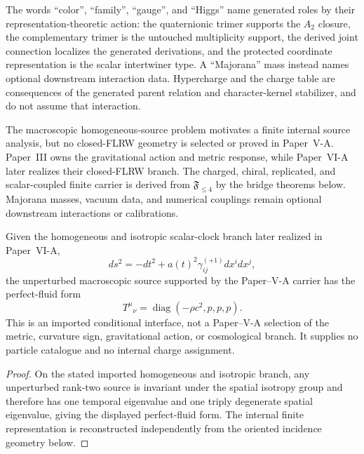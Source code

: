 \documentclass[12pt,a4paper]{article}
\begin{document}
\begin{remark}
\label{p5:rem:visible-sector-target-convention}
The words ``color'', ``family'', ``gauge'', and ``Higgs'' name generated
roles by their representation-theoretic action: the quaternionic trimer
supports the \(A_2\) closure, the complementary trimer is the untouched
multiplicity support, the derived joint connection localizes the generated
derivations, and the protected coordinate representation is the scalar
intertwiner type.  A ``Majorana'' mass instead names optional downstream
interaction data.  Hypercharge and the charge table are consequences of the
generated parent relation and character-kernel stabilizer, and do not
assume that interaction.
\end{remark}

\begin{remark}
\label{p5:rem:visible-source-support-residue}
The macroscopic homogeneous-source problem motivates a finite internal source
analysis, but no closed-FLRW geometry is selected or proved in Paper~V-A.
Paper~III owns the gravitational action and metric response, while Paper~VI-A
later realizes their closed-FLRW branch.  The charged, chiral, replicated, and
scalar-coupled finite carrier is derived from \(\mathfrak F_{\le4}\) by the
bridge theorems below.  Majorana masses, vacuum data, and numerical couplings
remain optional downstream interactions or calibrations.
\end{remark}

\begin{proposition}
\label{p5:thm:local-flrw-source-support-residue}
Given the homogeneous and isotropic scalar-clock branch later realized in Paper~VI-A,
\[
 ds^2=-dt^2+a(t)^2\gamma^{(+1)}_{ij}dx^idx^j,
\]
the unperturbed macroscopic source supported by the Paper--V-A carrier has the perfect-fluid form
\[
 T^\mu{}_{\nu}=\operatorname{diag}(-\rho c^2,p,p,p).
\]
This is an imported conditional interface, not a Paper--V-A selection of the metric, curvature sign, gravitational action, or cosmological branch.  It supplies no particle catalogue and no internal charge assignment.
\end{proposition}

\begin{proof}
On the stated imported homogeneous and isotropic branch, any unperturbed
rank-two source is invariant under the spatial isotropy group and therefore
has one temporal eigenvalue and one triply degenerate spatial eigenvalue,
giving the displayed perfect-fluid form.  The internal finite representation
is reconstructed independently from the oriented incidence geometry below.
\end{proof}
\end{document}
